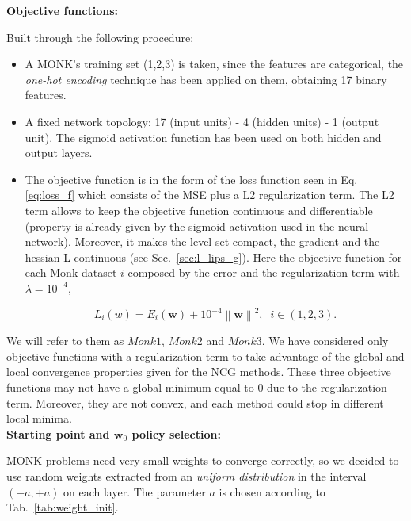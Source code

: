 \documentclass[11pt]{article}
\newcommand{\norm}[1]{\left\lVert#1\right\rVert}
\begin{document}
\textbf{Objective functions:}

Built through the following procedure:
\begin{itemize}
    \item A MONK's training set (1,2,3) is taken, since the features are categorical, the \emph{one-hot encoding} technique has been applied on them, obtaining 17 binary features.
    
    \item A fixed network topology: 17 (input units) -  4 (hidden units) - 1 (output unit). The sigmoid activation function has been used on both hidden and output layers.
    
    \item The objective function is in the form of the loss function seen in Eq.\ref{eq:loss_f} which consists of the MSE plus a L2 regularization term. The L2 term allows to keep the objective function continuous and differentiable (property is already given by the sigmoid activation used in the neural network). Moreover, it makes the level set compact, the gradient and the hessian L-continuous (see Sec.~\ref{sec:l_lips_g}). Here the objective function for each Monk dataset $i$ composed by the error and the regularization term with $\lambda = 10^{-4}$,
    
\begin{equation}
    L_i(w) = E_i(\mathbf{w}) + 10^{-4}\norm{\mathbf{w}}^2,\; \; i \in (1,2,3).
    \label{eq:monk_function}
\end{equation}
    
\end{itemize}
We will refer to them as $Monk1$, $Monk2$ and $Monk3$. We have considered only objective functions with a regularization term to take advantage of the global and local convergence properties given for the NCG methods. These three objective functions may not have a global minimum equal to 0 due to the regularization term. Moreover, they are not convex, and each method could stop in different local minima.\\

\textbf{Starting point and $\mathbf{w}_0$ policy selection:}

MONK problems need very small weights to converge correctly, so we decided to use random weights extracted from an \textit{uniform distribution} in the interval $(-a,+a)$ on each layer. The parameter $a$ is chosen according to Tab.~\ref{tab:weight_init}.
\end{document}
